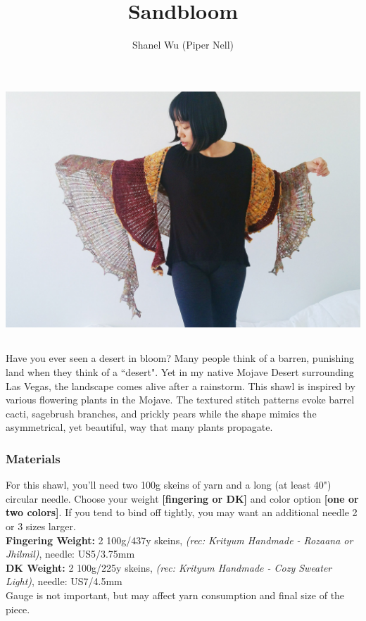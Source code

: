 \documentclass[12pt]{article}
\title{Sandbloom}
\author{Shanel Wu (Piper Nell)}
\begin{document}
\begin{titlingpage}

\includegraphics[width=6.5in]{both-arms.jpg}

\begin{multicols}{2}

\section*{\thetitle}
\subsubsection*{\theauthor}

Have you ever seen a desert in bloom? Many people think of a barren, punishing land when they think of a ``desert". Yet in my native Mojave Desert surrounding Las Vegas, the landscape comes alive after a rainstorm. This shawl is inspired by various flowering plants in the Mojave. The textured stitch patterns evoke barrel cacti, sagebrush branches, and prickly pears while the shape mimics the asymmetrical, yet beautiful, way that many plants propagate.

\vspace{-1em}
\subsubsection*{Materials}

For this shawl, you'll need two 100g skeins of yarn and a long (at least 40") circular needle. Choose your weight \textbf{[fingering or DK]} and color option \textbf{[one or two colors]}. If you tend to bind off tightly, you may want an additional needle 2 or 3 sizes larger. \\ 
\textbf{Fingering Weight:} 2 100g/437y skeins, \emph{(rec: Krityum Handmade - Rozaana or Jhilmil)}, needle: US5/3.75mm \\
\textbf{DK Weight:} 2 100g/225y skeins, \emph{(rec: Krityum Handmade - Cozy Sweater Light)}, needle: US7/4.5mm \\ Gauge is not important, but may affect yarn consumption and final size of the piece.


\end{multicols}
\end{titlingpage}
\end{document}
